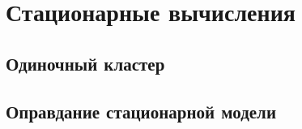 \section{Стационарные вычисления}

\subsection[]{Одиночный кластер}
%
\subsection[]{Оправдание стационарной модели}
%
